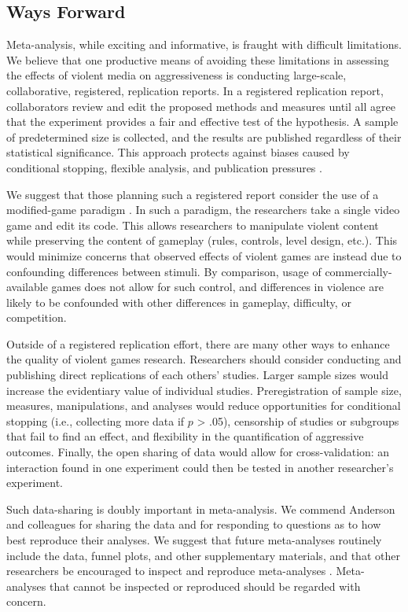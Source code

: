 \documentclass[man, mask]{apa6}
\begin{document}
\subsection{Ways Forward}
Meta-analysis, while exciting and informative, is fraught with difficult limitations.  We believe that one productive means of avoiding these limitations in assessing the effects of violent media on aggressiveness is conducting large-scale, collaborative, registered, replication reports. In a registered replication report, collaborators review and edit the proposed methods and measures until all agree that the experiment provides a fair and effective test of the hypothesis. A sample of predetermined size is collected, and the results are published regardless of their statistical significance. This approach protects against biases caused by conditional stopping, flexible analysis, and publication pressures \citep[see, e.g.,][]{Matzke:etal:2015}.  

We suggest that those planning such a registered report consider the use of a modified-game paradigm \citep{Elson:Quandt:2014,Engelhardt:etal:2015a,Engelhardt:etal:2015,Elson:etal:2013,Kneer:etal:inpress}. In such a paradigm, the researchers take a single video game and edit its code. This allows researchers to manipulate violent content while preserving the content of gameplay (rules, controls, level design, etc.). This would minimize concerns that observed effects of violent games are instead due to confounding differences between stimuli. By comparison, usage of commercially-available games does not allow for such control, and differences in violence are likely to be confounded with other differences in gameplay, difficulty, or competition.

Outside of a registered replication effort, there are many other ways to enhance the quality of violent games research. Researchers should consider conducting and publishing direct replications of each others' studies. Larger sample sizes would increase the evidentiary value of individual studies. Preregistration of sample size, measures, manipulations, and analyses would reduce opportunities for conditional stopping (i.e., collecting more data if $p$ > .05), censorship of studies or subgroups that fail to find an effect, and flexibility in the quantification of aggressive outcomes. Finally, the open sharing of data would allow for cross-validation: an interaction found in one experiment could then be tested in another researcher's experiment.

Such data-sharing is doubly important in meta-analysis. We commend Anderson and colleagues for sharing the data and for responding to questions as to how best reproduce their analyses. We suggest that future meta-analyses routinely include the data, funnel plots, and other supplementary materials, and that other researchers be encouraged to inspect and reproduce meta-analyses \citep{Lakens:etal:InPress}. Meta-analyses that cannot be inspected or reproduced should be regarded with concern.
\end{document}
